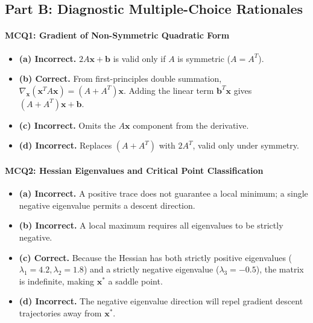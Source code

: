 \subsection*{Part B: Diagnostic Multiple-Choice Rationales}

\paragraph{MCQ1: Gradient of Non-Symmetric Quadratic Form}
\begin{itemize}
    \item \textbf{(a) Incorrect.} $2A\mathbf{x} + \mathbf{b}$ is valid only if $A$ is symmetric ($A = A^T$).
    \item \textbf{(b) Correct.} From first-principles double summation, $\nabla_{\mathbf{x}} (\mathbf{x}^T A \mathbf{x}) = (A + A^T)\mathbf{x}$. Adding the linear term $\mathbf{b}^T \mathbf{x}$ gives $(A + A^T)\mathbf{x} + \mathbf{b}$.
    \item \textbf{(c) Incorrect.} Omits the $A\mathbf{x}$ component from the derivative.
    \item \textbf{(d) Incorrect.} Replaces $(A + A^T)$ with $2A^T$, valid only under symmetry.
\end{itemize}

\paragraph{MCQ2: Hessian Eigenvalues and Critical Point Classification}
\begin{itemize}
    \item \textbf{(a) Incorrect.} A positive trace does not guarantee a local minimum; a single negative eigenvalue permits a descent direction.
    \item \textbf{(b) Incorrect.} A local maximum requires all eigenvalues to be strictly negative.
    \item \textbf{(c) Correct.} Because the Hessian has both strictly positive eigenvalues ($\lambda_1 = 4.2, \lambda_2 = 1.8$) and a strictly negative eigenvalue ($\lambda_3 = -0.5$), the matrix is indefinite, making $\mathbf{x}^*$ a saddle point.
    \item \textbf{(d) Incorrect.} The negative eigenvalue direction will repel gradient descent trajectories away from $\mathbf{x}^*$.
\end{itemize}

